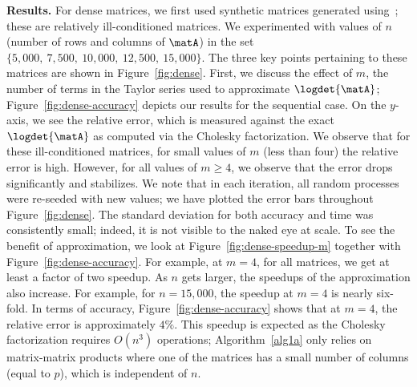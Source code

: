 \vspace{0.02in}\noindent \textbf{Results.}
For dense matrices, we first used synthetic matrices generated using~; these are relatively ill-conditioned matrices. We experimented with values of $n$ (number of rows and columns of $\matA$) in the set $\{5,000,\ 7,500,\ 10,000,\ 12,500,\ 15,000\}$.
The three key points pertaining to these matrices are shown in
Figure~\ref{fig:dense}.
First, we discuss the effect of $m$, the number of terms in the Taylor series
used to approximate $\logdet{\matA}$; Figure~\ref{fig:dense-accuracy} depicts
our results for the sequential case.
On the $y$-axis, we see the relative error, which is measured against the exact
$\logdet{\matA}$ as computed via the Cholesky factorization.
We observe that for these ill-conditioned matrices, for small values of $m$ (less than four)
the relative error is high.
However, for all values of $m\geq 4$, we observe that the error drops
significantly and stabilizes.
We note that in each iteration, all random processes were re-seeded with new
values; we have plotted the error bars throughout Figure~\ref{fig:dense}.
The standard deviation for both accuracy and time was consistently
small; indeed, it is not visible to the naked eye at scale.
To see the benefit of approximation, we look at
Figure~\ref{fig:dense-speedup-m} together with Figure~\ref{fig:dense-accuracy}.
For example, at $m=4$, for all matrices, we get at least a factor of two speedup.
As $n$ gets larger, the speedups of the
approximation also increase.
For example, for $n=15,000$, the speedup at $m=4$ is nearly six-fold. In terms of accuracy,
Figure~\ref{fig:dense-accuracy} shows that at $m=4$, the relative error is approximately
$4\%$.
This speedup is expected as the Cholesky factorization requires $O(n^3)$
operations; Algorithm~\ref{alg1a} only relies on matrix-matrix products where one
of the matrices has a small number of columns (equal to $p$), which is
independent of $n$.
